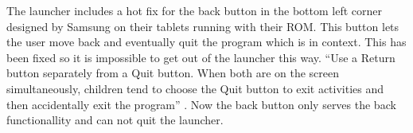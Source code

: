 The launcher includes a hot fix for the back button in the bottom left corner designed by Samsung on their tablets running with their ROM. This button lets the user move back and eventually quit the program which is in context. This has been fixed so it is impossible to get out of the launcher this way.
``Use a Return button separately from a Quit button. When both are on the screen simultaneously, children tend to choose the Quit button to exit activities and then accidentally exit the program'' \citep{microsoft:usability}. 
Now the back button only serves the back functionallity and can not quit the launcher.

